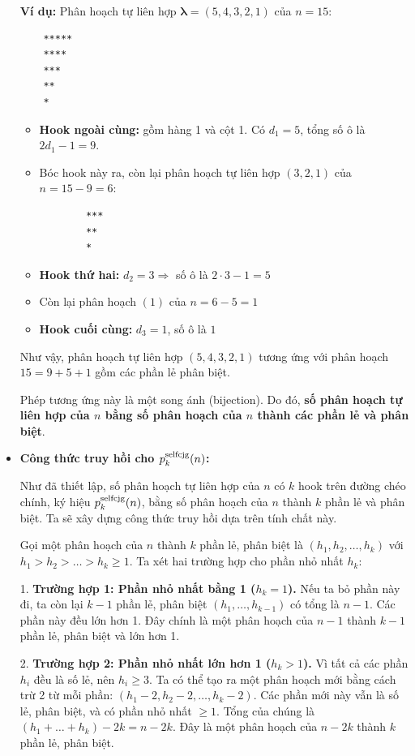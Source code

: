 \documentclass{article}
\begin{document}
\begin{itemize}
    \textbf{Ví dụ:} Phân hoạch tự liên hợp $\boldsymbol\lambda = (5,4,3,2,1)$ của $n=15$:
    \begin{verbatim}
    *****
    ****
    ***
    **
    *
    \end{verbatim}

    \begin{itemize}
        \item \textbf{Hook ngoài cùng:} gồm hàng 1 và cột 1. Có $d_1 = 5$, tổng số ô là $2d_1 - 1 = 9$.
        \item Bóc hook này ra, còn lại phân hoạch tự liên hợp $(3,2,1)$ của $n = 15 - 9 = 6$:
        \begin{verbatim}
        ***
        **
        *
        \end{verbatim}
        \item \textbf{Hook thứ hai:} $d_2 = 3 \Rightarrow$ số ô là $2 \cdot 3 - 1 = 5$
        \item Còn lại phân hoạch $(1)$ của $n=6 - 5 = 1$
        \item \textbf{Hook cuối cùng:} $d_3 = 1$, số ô là $1$
    \end{itemize}

    Như vậy, phân hoạch tự liên hợp $(5,4,3,2,1)$ tương ứng với phân hoạch $15 = 9 + 5 + 1$ gồm các phần lẻ phân biệt.

    Phép tương ứng này là một song ánh (bijection). Do đó, \textbf{số phân hoạch tự liên hợp của $n$ bằng số phân hoạch của $n$ thành các phần lẻ và phân biệt}.

    \item \textbf{Công thức truy hồi cho $p_k^{\rm selfcjg}(n)$:}

    Như đã thiết lập, số phân hoạch tự liên hợp của $n$ có $k$ hook trên đường chéo chính, ký hiệu $p_k^{\rm selfcjg}(n)$, bằng số phân hoạch của $n$ thành $k$ phần lẻ và phân biệt. Ta sẽ xây dựng công thức truy hồi dựa trên tính chất này.

    Gọi một phân hoạch của $n$ thành $k$ phần lẻ, phân biệt là $(h_1, h_2, \dots, h_k)$ với $h_1 > h_2 > \dots > h_k \ge 1$. Ta xét hai trường hợp cho phần nhỏ nhất $h_k$:

    1.  \textbf{Trường hợp 1: Phần nhỏ nhất bằng 1 ($h_k = 1$).}
        Nếu ta bỏ phần này đi, ta còn lại $k-1$ phần lẻ, phân biệt $(h_1, \dots, h_{k-1})$ có tổng là $n-1$. Các phần này đều lớn hơn 1. Đây chính là một phân hoạch của $n-1$ thành $k-1$ phần lẻ, phân biệt và lớn hơn 1.
        
    2.  \textbf{Trường hợp 2: Phần nhỏ nhất lớn hơn 1 ($h_k > 1$).}
        Vì tất cả các phần $h_i$ đều là số lẻ, nên $h_i \ge 3$. Ta có thể tạo ra một phân hoạch mới bằng cách trừ 2 từ mỗi phần: $(h_1-2, h_2-2, \dots, h_k-2)$. Các phần mới này vẫn là số lẻ, phân biệt, và có phần nhỏ nhất $\ge 1$. Tổng của chúng là $(h_1+\dots+h_k) - 2k = n - 2k$. Đây là một phân hoạch của $n-2k$ thành $k$ phần lẻ, phân biệt.
        

\end{itemize}
\end{document}

